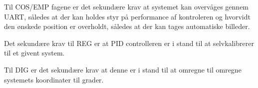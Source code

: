 Til COS/EMP fagene er det sekundære krav at systemet kan overvåges gennem UART, således at der kan holdes styr på performance af kontroleren og hvorvidt den ønskede position er overholdt, således at der kan tages automatiske billeder.

Det sekundære krav til REG er at PID controlleren er i stand til at selvkalibrerer til et givent system.

Til DIG er det sekundære krav at denne er i stand til at omregne til omregne systemets koordinater til grader.

%	
